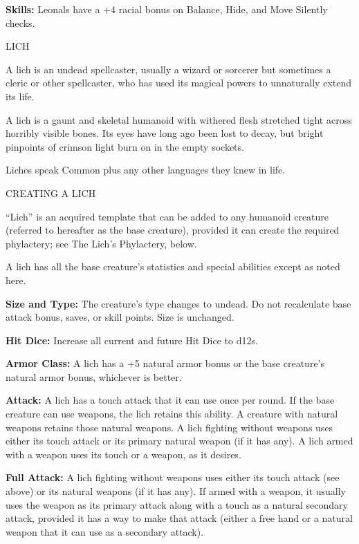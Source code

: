 \documentclass{article}
\begin{document}
\textbf{Skills:} Leonals have a +4 racial bonus on Balance, Hide, and Move Silently 
checks.

\vspace{12pt}
{\LARGE{}LICH}

A lich is an undead spellcaster, usually a wizard or sorcerer but sometimes a cleric 
or other spellcaster, who has used its magical powers to unnaturally extend its 
life.

A lich is a gaunt and skeletal humanoid with withered flesh stretched tight across 
horribly visible bones. Its eyes have long ago been lost to decay, but bright pinpoints 
of crimson light burn on in the empty sockets.

Liches speak Common plus any other languages they knew in life.

\vspace{12pt}
CREATING A LICH

``Lich'' is an acquired template that can be added to any humanoid creature (referred 
to hereafter as the base creature), provided it can create the required phylactery; 
see The Lich's Phylactery, below.

A lich has all the base creature's statistics and special abilities except as noted 
here.

\textbf{Size and Type:} The creature's type changes to undead. Do not recalculate 
base attack bonus, saves, or skill points. Size is unchanged.

\textbf{Hit Dice: }Increase all current and future Hit Dice to d12s.

\textbf{Armor Class:} A lich has a +5 natural armor bonus or the base creature's 
natural armor bonus, whichever is better.

\textbf{Attack: }A lich has a touch attack that it can use once per round. If the 
base creature can use weapons, the lich retains this ability. A creature with natural 
weapons retains those natural weapons. A lich fighting without weapons uses either 
its touch attack or its primary natural weapon (if it has any). A lich armed with 
a weapon uses its touch or a weapon, as it desires.

\textbf{Full Attack:} A lich fighting without weapons uses either its touch attack 
(see above) or its natural weapons (if it has any). If armed with a weapon, it 
usually uses the weapon as its primary attack along with a touch as a natural secondary 
attack, provided it has a way to make that attack (either a free hand or a natural 
weapon that it can use as a secondary attack).
\end{document}
